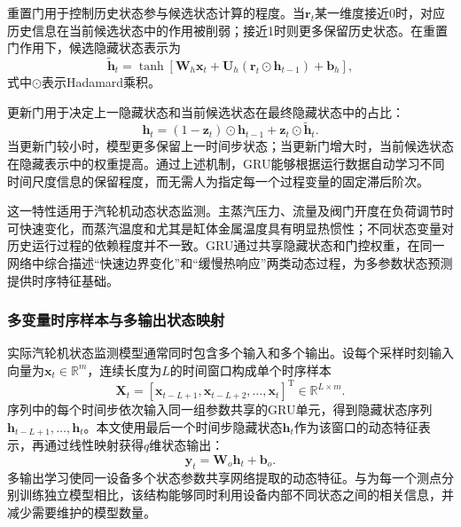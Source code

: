 重置门用于控制历史状态参与候选状态计算的程度。当$\mathbf{r}_t$某一维度接近0时，对应历史信息在当前候选状态中的作用被削弱；接近1时则更多保留历史状态。在重置门作用下，候选隐藏状态表示为
\begin{equation}
    \tilde{\mathbf{h}}_t=
    \tanh\left[
    \mathbf{W}_h\mathbf{x}_t+
    \mathbf{U}_h\left(
    \mathbf{r}_t\odot\mathbf{h}_{t-1}\right)+
    \mathbf{b}_h\right],
    \label{eq:gru_candidate_v3}
\end{equation}
式中$\odot$表示Hadamard乘积。

更新门用于决定上一隐藏状态和当前候选状态在最终隐藏状态中的占比：
\begin{equation}
    \mathbf{h}_t=
    \left(1-\mathbf{z}_t\right)\odot\mathbf{h}_{t-1}
    +\mathbf{z}_t\odot\tilde{\mathbf{h}}_t.
    \label{eq:gru_hidden_v3}
\end{equation}
当更新门较小时，模型更多保留上一时间步状态；当更新门增大时，当前候选状态在隐藏表示中的权重提高。通过上述机制，GRU能够根据运行数据自动学习不同时间尺度信息的保留程度，而无需人为指定每一个过程变量的固定滞后阶次。

这一特性适用于汽轮机动态状态监测。主蒸汽压力、流量及阀门开度在负荷调节时可快速变化，而蒸汽温度和尤其是缸体金属温度具有明显热惯性；不同状态变量对历史运行过程的依赖程度并不一致。GRU通过共享隐藏状态和门控权重，在同一网络中综合描述“快速边界变化”和“缓慢热响应”两类动态过程，为多参数状态预测提供时序特征基础。

\subsubsection{多变量时序样本与多输出状态映射}

实际汽轮机状态监测模型通常同时包含多个输入和多个输出。设每个采样时刻输入向量为$\mathbf{x}_t\in\mathbb{R}^{m}$，连续长度为$L$的时间窗口构成单个时序样本
\begin{equation}
    \mathbf{X}_t=
    \left[
    \mathbf{x}_{t-L+1},
    \mathbf{x}_{t-L+2},\ldots,
    \mathbf{x}_{t}
    \right]^\mathrm{T}
    \in\mathbb{R}^{L\times m}.
    \label{eq:sequence_sample_v3}
\end{equation}
序列中的每个时间步依次输入同一组参数共享的GRU单元，得到隐藏状态序列$\mathbf{h}_{t-L+1},\ldots,\mathbf{h}_t$。本文使用最后一个时间步隐藏状态$\mathbf{h}_t$作为该窗口的动态特征表示，再通过线性映射获得$q$维状态输出：
\begin{equation}
    \hat{\mathbf{y}}_t=
    \mathbf{W}_o\mathbf{h}_t+\mathbf{b}_o.
    \label{eq:multi_output_v3}
\end{equation}
多输出学习使同一设备多个状态参数共享网络提取的动态特征。与为每一个测点分别训练独立模型相比，该结构能够同时利用设备内部不同状态之间的相关信息，并减少需要维护的模型数量。

